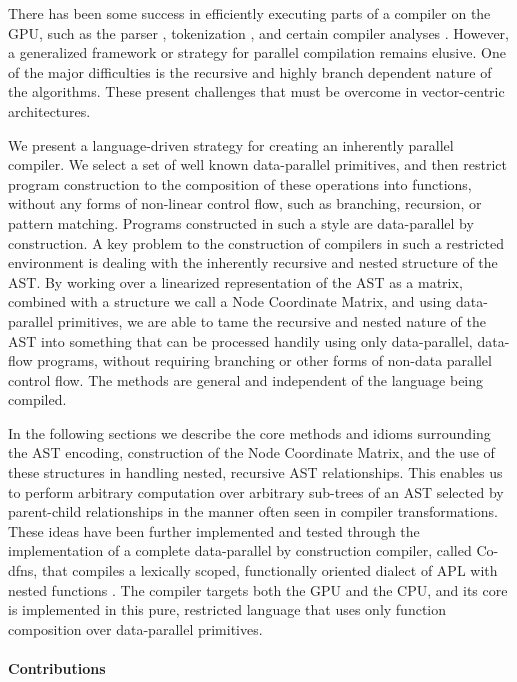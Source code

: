 \documentclass[numbers,preprint]{sigplanconf}
\begin{document}
There has been some success in efficiently executing parts of a compiler 
on the GPU, such as the parser \cite{bunda1984apl}, 
tokenization \cite{bernecky2003tokenizer}, and certain compiler 
analyses \cite{prabhu2011eigencfa,mendez2012inclusion}. However, a generalized 
framework or strategy for parallel compilation remains elusive. One of 
the major difficulties is the recursive and highly branch dependent nature 
of the algorithms. These present challenges that must be overcome in 
vector-centric architectures. 

We present a language-driven strategy for creating an inherently parallel 
compiler. We select a set of well known data-parallel primitives, and then 
restrict program construction to the composition of these operations into 
functions, without any forms of non-linear control flow, such as branching, 
recursion, or pattern matching. Programs constructed in such a style are 
data-parallel by construction. A key problem to the construction of compilers 
in such a restricted environment is dealing with the inherently recursive and 
nested structure of the AST. By working over a linearized representation of 
the AST as a matrix, combined with a structure we call a Node Coordinate 
Matrix, and using data-parallel primitives, we are able to tame the recursive 
and nested nature of the AST into something that can be processed handily 
using only data-parallel, data-flow programs, without requiring branching 
or other forms of non-data parallel control flow. 
The methods are general and independent of the language being compiled.

In the following sections we describe the core methods and idioms surrounding 
the AST encoding, construction of the Node Coordinate Matrix, and the use 
of these structures in handling nested, recursive AST relationships. This 
enables us to perform arbitrary computation over arbitrary sub-trees of an 
AST selected by parent-child relationships in the manner often seen in 
compiler transformations. These ideas have been further implemented and tested 
through the implementation of a complete data-parallel by construction 
compiler, called Co-dfns, that compiles a lexically scoped, functionally 
oriented dialect of APL with nested functions 
\cite{hsu2014co,hsu2015accelerating}.
The compiler targets both the
GPU and the CPU, and its core is implemented in this pure, restricted 
language that uses only function composition over data-parallel primitives. 

\paragraph{Contributions}
\end{document}
